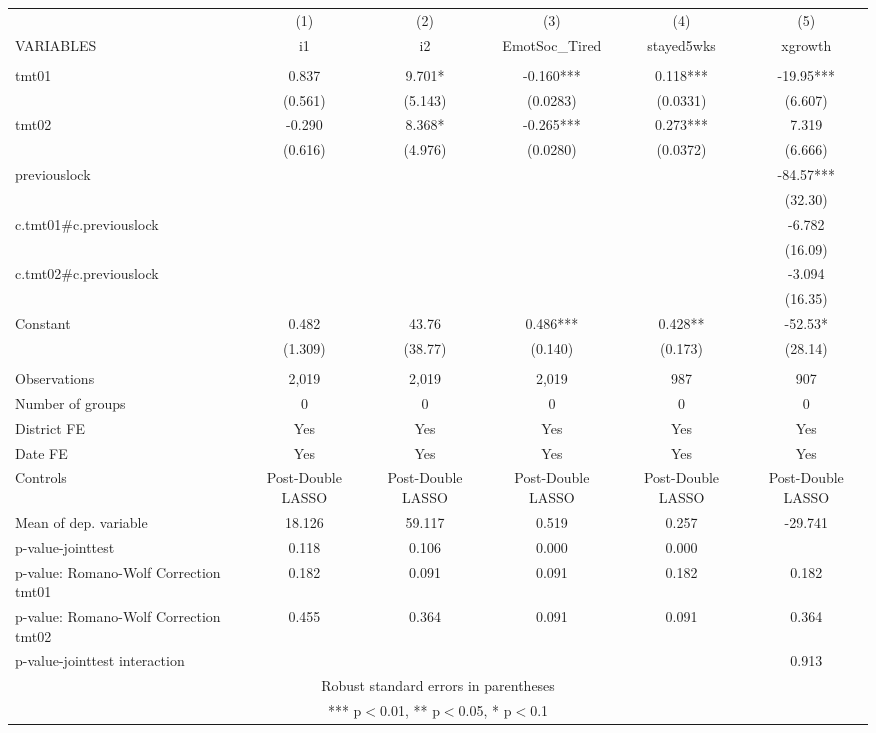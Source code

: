 \documentclass[]{article}
\begin{document}
\begin{tabular}{lccccc} \hline
 & (1) & (2) & (3) & (4) & (5) \\
VARIABLES & i1 & i2 & EmotSoc\_Tired & stayed5wks & xgrowth \\ \hline
 &  &  &  &  &  \\
tmt01 & 0.837 & 9.701* & -0.160*** & 0.118*** & -19.95*** \\
 & (0.561) & (5.143) & (0.0283) & (0.0331) & (6.607) \\
tmt02 & -0.290 & 8.368* & -0.265*** & 0.273*** & 7.319 \\
 & (0.616) & (4.976) & (0.0280) & (0.0372) & (6.666) \\
previouslock &  &  &  &  & -84.57*** \\
 &  &  &  &  & (32.30) \\
c.tmt01\#c.previouslock &  &  &  &  & -6.782 \\
 &  &  &  &  & (16.09) \\
c.tmt02\#c.previouslock &  &  &  &  & -3.094 \\
 &  &  &  &  & (16.35) \\
Constant & 0.482 & 43.76 & 0.486*** & 0.428** & -52.53* \\
 & (1.309) & (38.77) & (0.140) & (0.173) & (28.14) \\
 &  &  &  &  &  \\
Observations & 2,019 & 2,019 & 2,019 & 987 & 907 \\
Number of groups & 0 & 0 & 0 & 0 & 0 \\
District FE & Yes & Yes & Yes & Yes & Yes \\
Date FE & Yes & Yes & Yes & Yes & Yes \\
Controls & Post-Double LASSO & Post-Double LASSO & Post-Double LASSO & Post-Double LASSO & Post-Double LASSO \\
Mean of dep. variable & 18.126 & 59.117 & 0.519 & 0.257 & -29.741 \\
p-value-jointtest & 0.118 & 0.106 & 0.000 & 0.000 &  \\
p-value: Romano-Wolf Correction tmt01 & 0.182 & 0.091 & 0.091 & 0.182 & 0.182 \\
p-value: Romano-Wolf Correction tmt02 & 0.455 & 0.364 & 0.091 & 0.091 & 0.364 \\
 p-value-jointtest interaction &  &  &  &  & 0.913 \\ \hline
\multicolumn{6}{c}{ Robust standard errors in parentheses} \\
\multicolumn{6}{c}{ *** p$<$0.01, ** p$<$0.05, * p$<$0.1} \\
\end{tabular}
\end{document}
